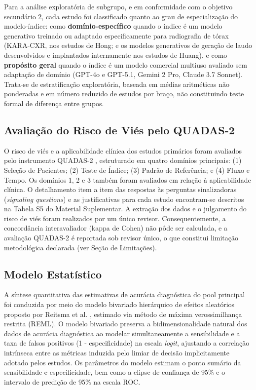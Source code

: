 \documentclass[12pt,a4paper]{article}
\begin{document}
Para a análise exploratória de subgrupo, e em conformidade com o objetivo secundário 2, cada estudo foi classificado quanto ao grau de especialização do modelo-índice: como \textbf{domínio-específico} quando o índice é um modelo generativo treinado ou adaptado especificamente para radiografia de tórax (KARA-CXR, nos estudos de Hong; e os modelos generativos de geração de laudo desenvolvidos e implantados internamente nos estudos de Huang), e como \textbf{propósito geral} quando o índice é um modelo comercial multiuso avaliado sem adaptação de domínio (GPT-4o e GPT-5.1, Gemini 2 Pro, Claude 3.7 Sonnet). Trata-se de estratificação exploratória, baseada em médias aritméticas não ponderadas e em número reduzido de estudos por braço, não constituindo teste formal de diferença entre grupos.

\subsection{Avaliação do Risco de Viés pelo QUADAS-2}
O risco de viés e a aplicabilidade clínica dos estudos primários foram avaliados pelo instrumento QUADAS-2 \cite{whiting}, estruturado em quatro domínios principais: (1) Seleção de Pacientes; (2) Teste de Índice; (3) Padrão de Referência; e (4) Fluxo e Tempo. Os domínios 1, 2 e 3 também foram avaliados em relação à aplicabilidade clínica. O detalhamento item a item das respostas às perguntas sinalizadoras (\textit{signaling questions}) e as justificativas para cada estudo encontram-se descritos na Tabela S5 do Material Suplementar. A extração dos dados e o julgamento do risco de viés foram realizados por um único revisor. Consequentemente, a concordância interavaliador (kappa de Cohen) não pôde ser calculada, e a avaliação QUADAS-2 é reportada sob revisor único, o que constitui limitação metodológica declarada (ver Seção de Limitações).

\subsection{Modelo Estatístico}
A síntese quantitativa das estimativas de acurácia diagnóstica do pool principal foi conduzida por meio do modelo bivariado hierárquico de efeitos aleatórios proposto por Reitsma et al. \cite{reitsma}, estimado via método de máxima verossimilhança restrita (REML). O modelo bivariado preserva a bidimensionalidade natural dos dados de acurácia diagnóstica ao modelar simultaneamente a sensibilidade e a taxa de falsos positivos (1 - especificidade) na escala \textit{logit}, ajustando a correlação intrínseca entre as métricas induzida pelo limiar de decisão implicitamente adotado pelos estudos. Os parâmetros do modelo estimam o ponto sumário da sensibilidade e especificidade, bem como a elipse de confiança de 95\% e o intervalo de predição de 95\% na escala ROC.
\end{document}
